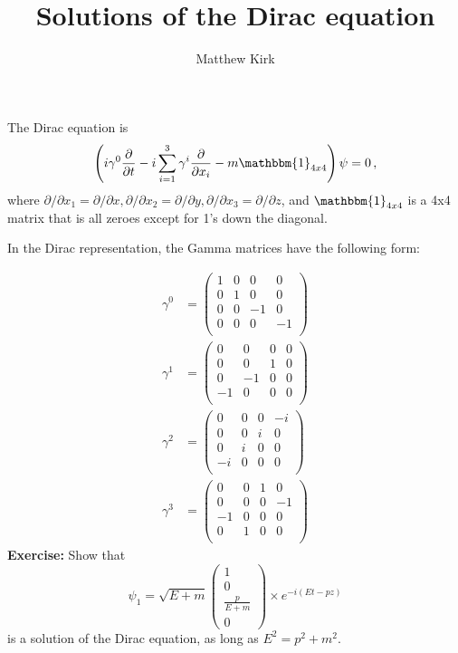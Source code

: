 \documentclass[a4paper,11pt]{article}
\author{Matthew Kirk}
\title{Solutions of the Dirac equation}
\numberwithin{equation}{section} %
\begin{document}
\maketitle


The Dirac equation is
\begin{equation}
\left( i \gamma^0 \frac{\partial}{\partial t} - i \sum_{i=1}^{3} \gamma^i \frac{\partial}{\partial x_i} - m \mathbbm{1}_{4x4} \right) \psi = 0 \,,
\end{equation}
where $\partial / \partial x_1 = \partial / \partial x, \partial / \partial x_2 = \partial / \partial y, \partial / \partial x_3 = \partial / \partial z$, and $\mathbbm{1}_{4x4}$ is a 4x4 matrix that is all zeroes except for 1's down the diagonal.

In the Dirac representation, the Gamma matrices have the following form:

\begin{align}
\gamma^0 &= \begin{pmatrix}
 1 & 0 & 0 & 0 \\
 0 & 1 & 0 & 0 \\
 0 & 0 & -1 & 0 \\
 0 & 0 & 0 & -1 \\
\end{pmatrix}
\\
\gamma^1 &= \begin{pmatrix}
 0 & 0 & 0 & 0 \\
 0 & 0 & 1 & 0 \\
 0 & -1 & 0 & 0 \\
 -1 & 0 & 0 & 0 \\
\end{pmatrix}
\\
\gamma^2 &= \begin{pmatrix}
 0 & 0 & 0 & -i \\
 0 & 0 & i & 0 \\
 0 & i & 0 & 0 \\
 -i & 0 & 0 & 0 \\
\end{pmatrix}
\\
\gamma^3 &= \begin{pmatrix}
 0 & 0 & 1 & 0 \\
 0 & 0 & 0 & -1 \\
 -1 & 0 & 0 & 0 \\
 0 & 1 & 0 & 0 \\
\end{pmatrix}
\end{align}
\textbf{Exercise:} Show that
\begin{equation}
\psi_1 = \sqrt{E+m} \begin{pmatrix} 1 \\ 0 \\ \frac{p}{E+m} \\ 0 \end{pmatrix} \times e^{-i (E t - p z)}
\end{equation}
is a solution of the Dirac equation, as long as $E^2 = p^2 + m^2$.
\end{document}
